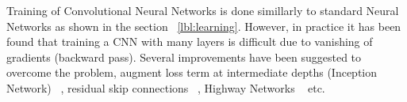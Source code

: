 Training of Convolutional Neural Networks is done simillarly to standard Neural Networks as shown in the section ~\ref{lbl:learning}. However, in practice it has been found that training a CNN with many layers is difficult due to vanishing of gradients (backward pass). Several improvements have been suggested to overcome the problem, augment loss term at intermediate depths (Inception Network) ~\cite{Szegedy2016RethinkingTI}, residual skip connections ~\cite{he2016deep}, Highway Networks ~\cite{srivastava2015highway} etc. 

